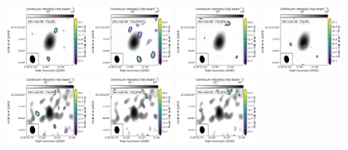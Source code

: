 \begin{figure}[htbp!]
  \centering
  \includegraphics[width=0.24\textwidth]{./moment0/Set2_ID16_CH3OH_243915.pdf}
  \includegraphics[width=0.24\textwidth]{./moment0/Set2_ID16_CH3OCHO_259342.pdf}
  \includegraphics[width=0.24\textwidth]{./moment0/Set2_ID16_CH3OCH3_259311.pdf}
  \includegraphics[width=0.24\textwidth]{./moment0/Set2_ID16_CH3CN_257527.pdf}
  \\
  \includegraphics[width=0.24\textwidth]{./moment0/Set2_ID04_CH3OH_243915.pdf}
  \includegraphics[width=0.24\textwidth]{./moment0/Set2_ID04_CH3OCHO_259342.pdf}
  \includegraphics[width=0.24\textwidth]{./moment0/Set2_ID04_CH3OCH3_259311.pdf}

\end{figure}
